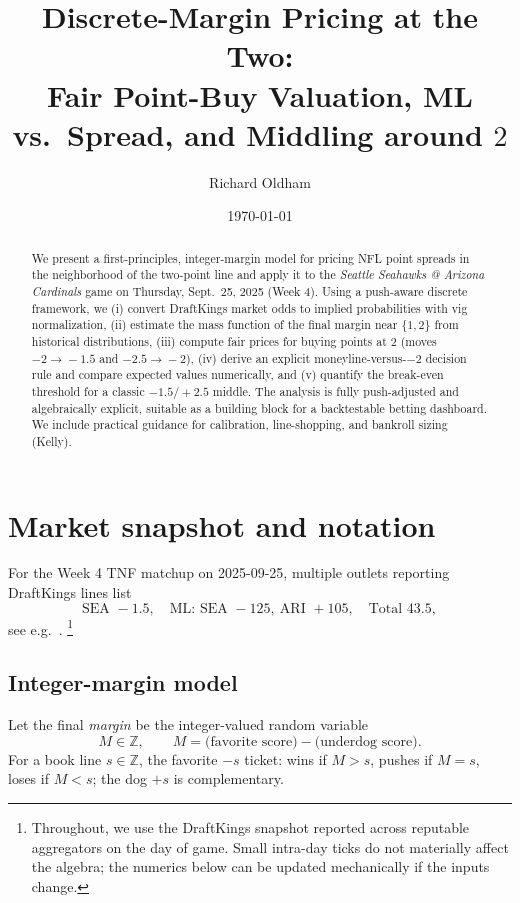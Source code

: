 \documentclass[11pt]{amsart}
\title[Discrete-Margin Pricing at the Two]{Discrete-Margin Pricing at the Two: \\ Fair Point-Buy Valuation, ML vs.\ Spread, and Middling around $2$}
\author[Richard Oldham]{Richard Oldham}
\date{\today}
\begin{document}
\begin{abstract}
We present a first-principles, integer-margin model for pricing NFL point spreads in the neighborhood of the two-point line and apply it to the \emph{Seattle Seahawks @ Arizona Cardinals} game on Thursday, Sept.\ 25, 2025 (Week 4). Using a push-aware discrete framework, we (i) convert DraftKings market odds to implied probabilities with vig normalization, (ii) estimate the mass function of the final margin near $\{1,2\}$ from historical distributions, (iii) compute fair prices for buying points at $2$ (moves $-2\!\to\!-1.5$ and $-2.5\!\to\!-2$), (iv) derive an explicit moneyline-versus-$-2$ decision rule and compare expected values numerically, and (v) quantify the break-even threshold for a classic $-1.5/+2.5$ middle. The analysis is fully push-adjusted and algebraically explicit, suitable as a building block for a backtestable betting dashboard. We include practical guidance for calibration, line-shopping, and bankroll sizing (Kelly).
\end{abstract}

\maketitle

\section{Market snapshot and notation}
For the Week 4 TNF matchup on 2025-09-25, multiple outlets reporting DraftKings lines list
\[
\text{SEA }-1.5,\quad \text{ML: SEA }-125,\ \text{ARI }+105,\quad \text{Total }43.5,
\]
see e.g.\ \cite{DKN-BestBets-SEA-ARI-2025,Action-SEA-ARI-Preview-2025,Sportshandle-SEA-ARI-2025,Oddsshark-SEA-ARI-2025}.%
\footnote{Throughout, we use the DraftKings snapshot reported across reputable aggregators on the day of game. Small intra-day ticks do not materially affect the algebra; the numerics below can be updated mechanically if the inputs change.}

\subsection*{Integer-margin model}
Let the final \emph{margin} be the integer-valued random variable
\[
M \in \mathbb{Z},\qquad M=\text{(favorite score)}-\text{(underdog score)}.
\]
For a book line $s\in\mathbb{Z}$, the favorite $-s$ ticket: wins if $M>s$, pushes if $M=s$, loses if $M<s$; the dog $+s$ is complementary.
\end{document}
